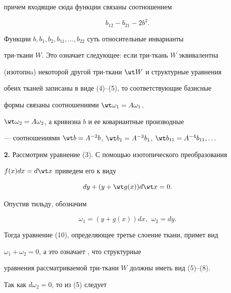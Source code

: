 причем входящие сюда функции связаны соотношением 


\begin{equation} 


b_{12}-b_{21}-2b^2. 


\end{equation} 


Функции $b,b_1,b_2,b_{11},\dotsc,b_{22}$ суть относительные инварианты 


три-ткани $W$. Это означает следующее: если три-ткань $W$ эквивалентна 


(изотопнa) некоторой другой три-ткани $\wt W$ и структурные уравнения 


обеих тканей записаны в виде (4)--(5), то соответствующие базисные 


формы связаны соотношениями $\wt\omega_1=A\omega_1$, 


$\wt\omega_2=A\omega_2$, а кривизна $b$ и ее ковариантные производные 


--- соотношениями $\wt b=A^{-2}b$, $\wt b_1=A^{-3}b_1$, $\wt 


b_{11}=A^{-4}b_{11},\dotsc$ 


\medskip 


 


{\bf 2.} Рассмотрим уравнение (3). С помощью изотопического преобразования 


$f(x)dx=d\wt x$ приведем его к виду 


\begin{equation} 


dy+(y+\wt g(x))d\wt x=0. 


\end{equation} 


Опустив тильду, обозначим 


\begin{equation} 


\omega_1=(y+g(x))dx,\ \ \omega_2=dy. 


\end{equation} 


Тогда уравнение (10), определяющее третье слоение ткани, примет вид 


$\omega_1+\omega_2=0$, а это означает \cite{1}, что структурные 


уравнения рассматриваемой три-ткани $W$ должны иметь вид (5)--(8). 


 


Так как $d\omega_2=0$, то из (5) следует 


